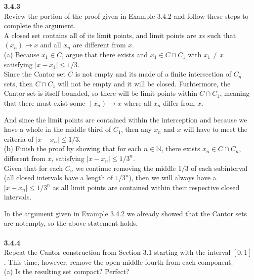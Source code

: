 \textbf{3.4.3}
\\

Review the portion of the proof given in Example 3.4.2 and follow these steps to complete the argument.
\\

A closed set contains all of its limit points, and limit points are $x$s such that
$(x_n) \rightarrow x$ and all $x_n$ are different from $x$.
\\

(a) Because $x_1 \in C$, argue that there exists and $x_1 \in C \cap C_1$ with $x_1 \neq x$
satisfying $|x - x_1| \leq 1/3$.
\\

Since the Cantor set $C$ is not empty and its made of a finite intersection of $C_n$ sets,
then $C \cap C_1$ will not be empty and it will be closed.
Furhtermore, the Cantor set is itself bounded, so there will be limit points within $C \cap C_1$,
meaning that there must exist some $(x_n) \rightarrow x$ where all $x_n$ differ from $x$.

And since the limit points are contained within the interception and because we have a whole in the middle
third of $C_1$, then any $x_n$ and $x$ will have to meet the criteria of $|x - x_n| \leq 1/3$.
\\

(b) Finish the proof by showing that for each $n\in\mathbb{N}$, there exists $x_n \in C \cap C_n$,
different from $x$, satisfying $|x - x_n| \leq 1/3^n$.
\\

Given that for each $C_n$ we continue removing the middle $1/3$ of each subinterval (all closed intervals have
a length of $1/3^n$),
then we will always have a $|x - x_n| \leq 1/3^n$ as all limit points are contained within their respective
closed intervals.

In the argument given in Example 3.4.2 we already showed that the Cantor sets are notempty, so the above statement holds.
\\~\\



\textbf{3.4.4}
\\

Repeat the Cantor construction from Section 3.1 starting with the interval $[0,1]$.
This time, however, remove the open middle fourth from each component.
\\


(a) Is the resulting set compact? Perfect?
\\

